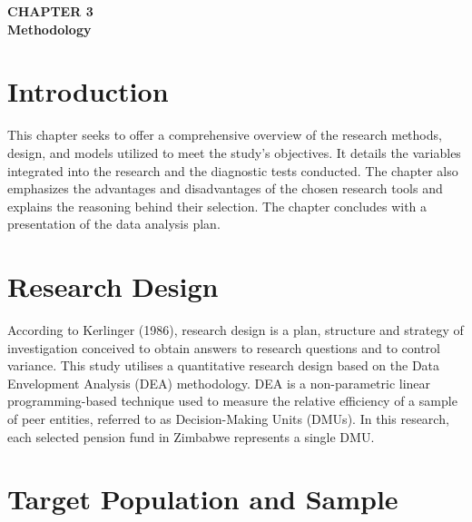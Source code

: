 \documentclass[12pt,a4paper]{article}
\begin{document}
\newpage

\begin{center}
    {\LARGE\bfseries CHAPTER 3}\\[0.5cm]
    {\Large\bfseries Methodology}
\end{center}
\setcounter{section}{0}
\renewcommand{\thesection}{3.\arabic{section}}
{}

\vspace{1cm}

\section{Introduction}

This chapter seeks to offer a comprehensive overview of the research methods, design, and models utilized to meet the study's objectives. It details the variables integrated into the research and the diagnostic tests conducted. The chapter also emphasizes the advantages and disadvantages of the chosen research tools and explains the reasoning behind their selection. The chapter concludes with a presentation of the data analysis plan.

\section{Research Design}

According to Kerlinger (1986), research design is a plan, structure and strategy of investigation conceived to obtain answers to research questions and to control variance. This study utilises a quantitative research design based on the Data Envelopment Analysis (DEA) methodology. DEA is a non-parametric linear programming-based technique used to measure the relative efficiency of a sample of peer entities, referred to as Decision-Making Units (DMUs). In this research, each selected pension fund in Zimbabwe represents a single DMU.

\section{Target Population and Sample}
\end{document}
